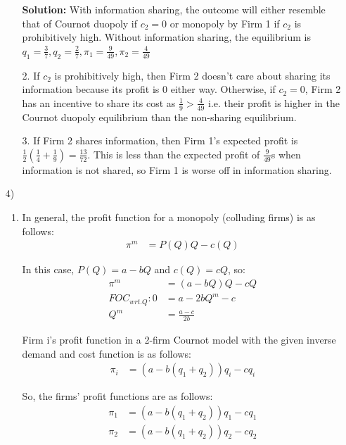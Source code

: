 \documentclass[12pt,letterpaper]{article}
\begin{document}
\begin{enumerate}
\begin{enumerate}
    {\color{blue}\textbf{Solution:} With information sharing, the outcome will either resemble that of Cournot duopoly if $c_2=0$ or monopoly by Firm 1 if $c_2$ is prohibitively high. Without information sharing, the equilibrium is $q_1  = \frac{3}{7}, q_2 = \frac{2}{7}, \pi_1 = \frac{9}{49}, \pi_2 = \frac{4}{49}$}

    \item[2.] If $c_2$ is prohibitively high, then Firm 2 doesn't care about sharing its information because its profit is 0 either way. Otherwise, if $c_2 = 0$, Firm 2 has an incentive to share its cost as $\frac{1}{9} > \frac{4}{49}$ i.e. their profit is higher in the Cournot duopoly equilibrium than the non-sharing equilibrium. 
    \item[3.] If Firm 2 shares information, then Firm 1's expected profit is $\frac{1}{2} (\frac{1}{4} + \frac{1}{9}) = \frac{13}{72}$. This is less than the expected profit of $\frac{9}{49}$s when information is not shared, so Firm 1 is worse off in information sharing.
\end{enumerate}

\item[4)]

\begin{enumerate}

    \item In general, the profit function for a monopoly (colluding firms) is as follows:
    \begin{align*}
        \pi^m &= P(Q)Q - c(Q)
    \end{align*}
    
    In this case, $P(Q) = a-bQ$ and $c(Q) = cQ$, so:
    \begin{align*}
        \pi^m &= (a-bQ)Q - cQ\\
        FOC_{wrt.Q}: 0 &= a-2bQ^m - c\\
        Q^m &= \frac{a-c}{2b}
    \end{align*}
    
    Firm i's profit function in a 2-firm Cournot model with the given inverse demand and cost function is as follows:
    \begin{align*}
        \pi_i &= (a - b(q_1 + q_2))q_i - cq_i
    \end{align*}
    
    So, the firms' profit functions are as follows:
    \begin{align*}
        \pi_1 &= (a - b(q_1 + q_2))q_1 - cq_1\\
        \pi_2 &= (a - b(q_1 + q_2))q_2 - cq_2
    \end{align*}
    

\end{enumerate}
\end{enumerate}
\end{document}
